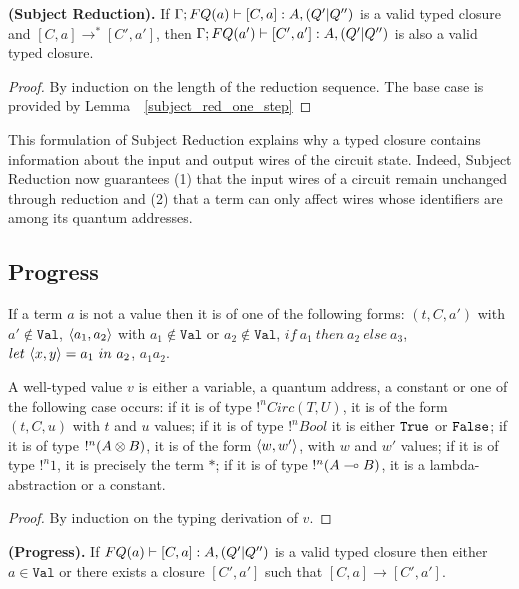 \documentclass{article}
\begin{document}
\begin{corollary}
{\bf (Subject Reduction).}
If $\Gamma;FQ(a)\vdash [C,a]:A,(Q'|Q'')$ is a valid typed closure 
and $[C,a]\to^* [C',a']$, then $\Gamma;FQ(a')\vdash [C',a']:A,(Q'|Q'')$ 
is also a valid typed closure.
\end{corollary}

\begin{proof}
By induction on the length of the reduction sequence. The base case is 
provided by Lemma~~\hyperref[subject_red_one_step]{\ref*{subject_red_one_step}}
\end{proof}

This formulation of Subject Reduction explains why a typed closure contains 
information about the input and output wires of the circuit state. Indeed, 
Subject Reduction now guarantees (1) that the input wires of a circuit 
remain unchanged through reduction and (2) that a term can only affect 
wires whose identifiers are among its quantum addresses.

\subsection{Progress}

\begin{lemma}
\label{non_values}
If a term $a$ is not a value then it is of one 
of the following forms: $(t,C,a')$ with $a'\notin \mathtt{Val}$, 
$\langle a_1,a_2\rangle$ with $a_1\notin \mathtt{Val}$ or $a_2\notin \mathtt{Val}$, 
$if ~a_1~ then ~a_2~ else ~a_3$, $let ~\langle x,y\rangle=a_1~ in ~a_2$, $a_1a_2$.
\end{lemma}

\begin{lemma}
\label{form_values}
A well-typed value $v$ is either a variable, a quantum address, a constant or one 
of the following case occurs: if it is of type $!^nCirc(T,U)$, it is of the 
form $(t,C,u)$ with $t$ and $u$ values; if it is of type $!^nBool$ it is either 
$\texttt{True}$ or $\texttt{False}$; if it is of type $!^n (A\otimes B)$, it is of the
form $\langle w,w'\rangle$, with $w$ and $w'$ values; if it is of type $!^n1$, it is 
precisely the term $*$; if it is of type $!^n (A\multimap B)$, it is a 
lambda-abstraction or a constant.
\end{lemma}

\begin{proof}
By induction on the typing derivation of $v$.
\end{proof}

\begin{proposition}
{\bf (Progress).}
If $FQ(a)\vdash [C,a]:A,(Q'|Q'')$ is a valid typed closure then either 
$a\in\mathtt{Val}$ or there exists a closure $[C',a']$ such that 
$[C,a]\to [C',a']$.
\end{proposition}
\end{document}
